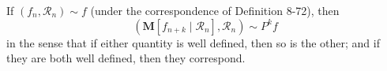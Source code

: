If $(f_n, \mathcal{R}_n) \sim f$ (under the correspondence of Definition 8-72), then
$$(\mathbf{M}[f_{n+k} \mid \mathcal{R}_n], \mathcal{R}_n) \sim P^k f$$
in the sense that if either quantity is well defined, then so is the other; and if they are both well defined, then they correspond.
